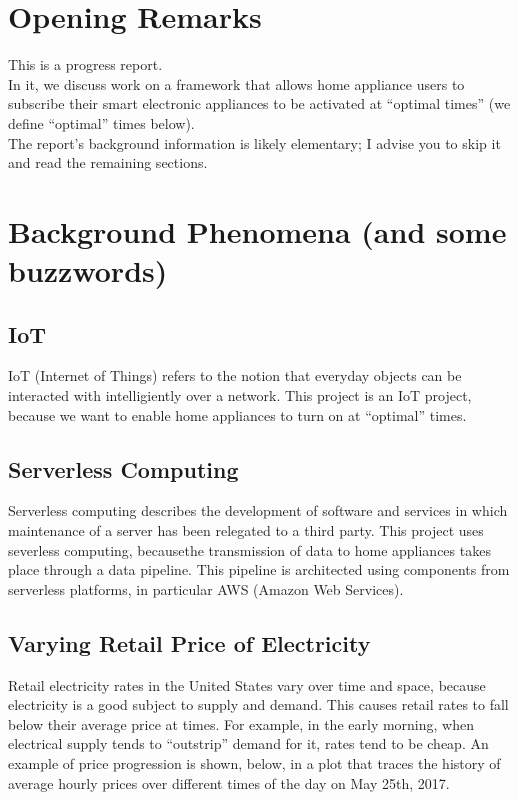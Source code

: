 \documentclass[a4paper]{article}
\begin{document}
\tableofcontents
\section{Opening Remarks}


This is a progress report. \\

In it, we discuss work on a framework that allows home appliance users to subscribe their smart electronic appliances  to be activated at ``optimal times'' (we define ``optimal'' times below). \\

 The report's background information is likely elementary; I advise you to skip it and read the remaining sections.

\section{Background Phenomena (and some buzzwords)}

\subsection{IoT}
IoT (Internet of Things) refers to the notion that everyday objects can be interacted with intelligiently over a network. This project is an IoT project, because we want to enable home appliances to turn on at ``optimal'' times.

\subsection{Serverless Computing}
Serverless computing describes the development of software and services in which maintenance of a server has been relegated to a third party. This project uses severless computing, becausethe transmission of data to home appliances takes place through a data pipeline. This pipeline is architected using components from serverless platforms, in particular AWS (Amazon Web Services).

\subsection{Varying Retail Price of Electricity}
Retail electricity rates in the United States vary over time and space, because electricity is a good subject to supply and demand. This causes retail rates to fall below their average price at times. For example, in the early morning, when electrical supply tends to ``outstrip'' demand for it, rates tend to be cheap. An example of price progression is shown, below, in a plot that traces the history of average hourly prices over different times of the day on May 25th, 2017.
\end{document}
